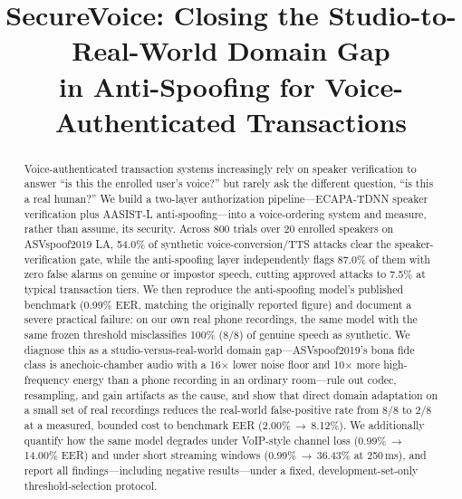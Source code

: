 \documentclass[conference]{IEEEtran}
\begin{document}
\title{SecureVoice: Closing the Studio-to-Real-World Domain Gap\\
in Anti-Spoofing for Voice-Authenticated Transactions}

\author{
}

\maketitle

\begin{abstract}
Voice-authenticated transaction systems increasingly rely on speaker
verification to answer ``is this the enrolled user's voice?'' but rarely ask
the different question, ``is this a real human?'' We build a two-layer
authorization pipeline---ECAPA-TDNN speaker verification plus AASIST-L
anti-spoofing---into a voice-ordering system and measure, rather than assume,
its security. Across 800 trials over 20 enrolled speakers on ASVspoof2019 LA,
54.0\% of synthetic voice-conversion/TTS attacks clear the speaker-verification
gate, while the anti-spoofing layer independently flags 87.0\% of them with
zero false alarms on genuine or impostor speech, cutting approved attacks to
7.5\% at typical transaction tiers. We then reproduce the anti-spoofing model's
published benchmark (0.99\% EER, matching the originally reported figure) and
document a severe practical failure: on our own real phone recordings, the same
model with the same frozen threshold misclassifies 100\% (8/8) of genuine
speech as synthetic. We diagnose this as a studio-versus-real-world domain
gap---ASVspoof2019's bona fide class is anechoic-chamber audio with a
16$\times$ lower noise floor and 10$\times$ more high-frequency energy than a
phone recording in an ordinary room---rule out codec, resampling, and gain
artifacts as the cause, and show that direct domain adaptation on a small set
of real recordings reduces the real-world false-positive rate from 8/8 to 2/8
at a measured, bounded cost to benchmark EER (2.00\%\,$\rightarrow$\,8.12\%).
We additionally quantify how the same model degrades under VoIP-style channel
loss (0.99\%\,$\rightarrow$\,14.00\% EER) and under short streaming windows
(0.99\%\,$\rightarrow$\,36.43\% at 250\,ms), and report all findings---including
negative results---under a fixed, development-set-only threshold-selection
protocol.
\end{abstract}
\end{document}
